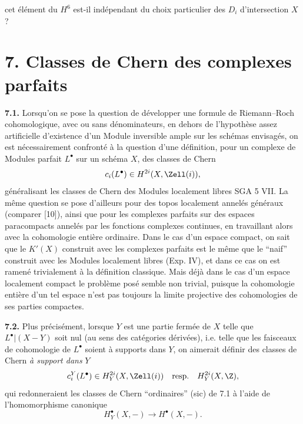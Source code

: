 cet
élément du $H^6$ est-il indépendant du choix particulier des $D_i$ d'intersection $X$?

\section*{7. Classes de Chern des complexes parfaits}

\textbf{7.1.} Lorsqu'on se pose la question de développer une formule de Riemann--Roch cohomologique, avec ou sans dénominateurs, en dehors de l'hypothèse assez artificielle d'existence d'un Module inversible ample sur les schémas envisagés, on est nécessairement confronté à la question d'une définition, pour un complexe de Modules parfait $L^\bullet$ sur un schéma $X$, des classes de Chern
\[
 c_i(L^\bullet)\in H^{2i}(X,\Zell(i)),
\]
généralisant les classes de Chern des Modules localement libres SGA 5 VII. La même question se pose d'ailleurs pour des topos localement annelés généraux (comparer [10]), ainsi que pour les complexes parfaits sur des espaces paracompacts annelés par les fonctions complexes continues, en travaillant alors avec la cohomologie entière ordinaire. Dans le cas d'un espace compact, on sait que le $K'(X)$ construit avec les complexes parfaits est le même que le ``naif'' construit avec les Modules localement libres (Exp. IV), et dans ce cas on est ramené trivialement à la définition classique. Mais déjà dans le cas d'un espace localement compact le problème posé semble non trivial, puisque la cohomologie entière d'un tel espace n'est pas toujours la limite projective des cohomologies de ses parties compactes.

\textbf{7.2.} Plus précisément, lorsque $Y$ est une partie fermée de $X$ telle que $L^\bullet|(X-Y)$ soit nul (au sens des catégories dérivées), i.e. telle que les faisceaux de cohomologie de $L^\bullet$ soient à supports dans $Y$, on aimerait définir des classes de Chern \emph{à support dans} $Y$
\[
 c_i^Y(L^\bullet)\in H_Y^{2i}(X,\Zell(i))\quad\text{resp.}\quad H_Y^{2i}(X,\Z),
\]
qui redonneraient les classes de Chern ``ordinaires'' (sic) de 7.1 à l'aide de l'homomorphisme canonique
\[
 H_Y^\bullet(X,-)\longrightarrow H^\bullet(X,-).
\]
